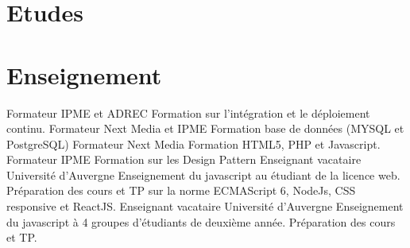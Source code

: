 \documentclass[11pt,a4paper]{moderncv}
\begin{document}
    \section{Etudes}

    \section{Enseignement}
        {Formateur}
        {IPME et ADREC}
        {}
        {}
        {
          Formation sur l'intégration et le déploiement continu.
        }
        {Formateur}
        {Next Media et IPME}
        {}
        {}
        {
          Formation base de données (MYSQL et PostgreSQL)
        }
        {Formateur}
        {Next Media}
        {}
        {}
        {
          Formation HTML5, PHP et Javascript.
        }
        {Formateur}
        {IPME}
        {}
        {}
        {
            Formation sur les Design Pattern
        }
        {Enseignant vacataire}
        {Université d'Auvergne}
        {}
        {}
        {
          Enseignement du javascript au étudiant de la licence web.\newline{}
          Préparation des cours et TP sur la norme ECMAScript 6, NodeJs, CSS
          responsive et ReactJS.
        }
        {Enseignant vacataire}
        {Université d'Auvergne}
        {}
        {}
        {
          Enseignement du javascript à 4 groupes d'étudiants de deuxième année.\newline{}
          Préparation des cours et TP.
        }
\pagebreak
\end{document}
